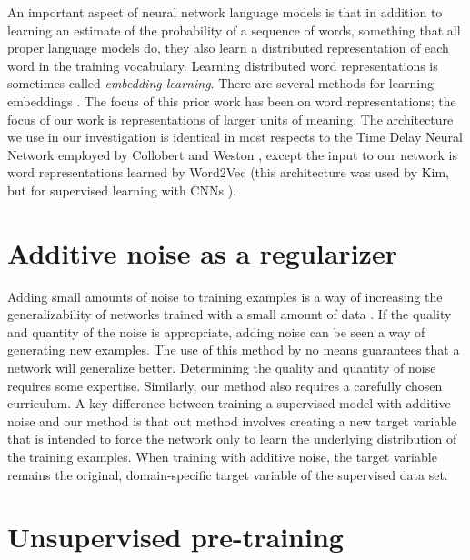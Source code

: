 An important aspect of neural network language models is that in addition
to learning an estimate of the probability of a sequence of words, something
that all proper language models do, they also learn a distributed
representation of each word in the training vocabulary.  Learning
distributed word representations is sometimes called \textit{embedding
learning}.  There are several methods for learning embeddings
\cite{Bengio2003-lk,Mnih2008-nf,Collobert2008-su,Mikolov2011-pe,JeffreyPennington2014-fc}.
The focus of this prior work has been on word representations; the
focus of our work is representations of larger units of meaning.  The
architecture we use in our investigation is identical in most respects to
the Time Delay Neural Network employed by Collobert and Weston
\cite{Collobert2008-su}, except the input to our network is word
representations learned by Word2Vec (this architecture was used
by Kim, but for supervised learning with CNNs \cite{Kim2014-vy}).


\section{Additive noise as a regularizer}

Adding small amounts of noise to training examples is a way of increasing
the generalizability of networks trained with a small amount of data
\cite{Hammadi1998-kf,Grandvalet1997-qc,Grandvalet1995-tu,Bishop1995-ry,Reed1995-nh,Matsuoka1992-ee,Holmstrom1992-tm,Sietsma1991-ks}.
If the quality and quantity of the noise is appropriate, adding noise can
be seen a way of generating new examples.  The use of this method by no
means guarantees that a network will generalize better.  Determining the
quality and quantity of noise requires some expertise.  Similarly, our
method also requires a carefully chosen curriculum.  A key difference
between training a supervised model with additive noise and our method
is that out method involves creating a new target variable that is
intended to force the network only to learn the underlying distribution
of the training examples.  When training with additive noise, the target
variable remains the original, domain-specific target variable of the
supervised data set.

\section{Unsupervised pre-training}

